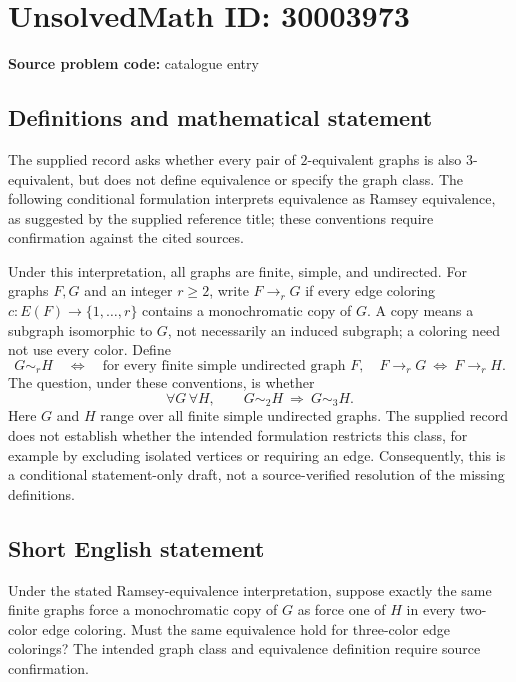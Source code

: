 \documentclass[11pt]{article}
\begin{document}
\section*{UnsolvedMath ID: 30003973}
\textbf{Source problem code:} catalogue entry
\subsection{Definitions and mathematical statement}
The supplied record asks whether every pair of \(2\)-equivalent graphs is also \(3\)-equivalent, but does not define equivalence or specify the graph class. The following conditional formulation interprets equivalence as Ramsey equivalence, as suggested by the supplied reference title; these conventions require confirmation against the cited sources.

Under this interpretation, all graphs are finite, simple, and undirected. For graphs \(F,G\) and an integer \(r\geq 2\), write \(F\to_r G\) if every edge coloring \(c:E(F)\to\{1,\ldots,r\}\) contains a monochromatic copy of \(G\). A copy means a subgraph isomorphic to \(G\), not necessarily an induced subgraph; a coloring need not use every color. Define
\[
G\sim_r H
\quad\Longleftrightarrow\quad
\text{for every finite simple undirected graph }F,
\quad F\to_r G\ \Longleftrightarrow\ F\to_r H.
\]
The question, under these conventions, is whether
\[
\forall G\,\forall H,\qquad
G\sim_2 H\ \Longrightarrow\ G\sim_3 H.
\]
Here \(G\) and \(H\) range over all finite simple undirected graphs. The supplied record does not establish whether the intended formulation restricts this class, for example by excluding isolated vertices or requiring an edge. Consequently, this is a conditional statement-only draft, not a source-verified resolution of the missing definitions.
\subsection{Short English statement}
Under the stated Ramsey-equivalence interpretation, suppose exactly the same finite graphs force a monochromatic copy of \(G\) as force one of \(H\) in every two-color edge coloring. Must the same equivalence hold for three-color edge colorings? The intended graph class and equivalence definition require source confirmation.
\end{document}
